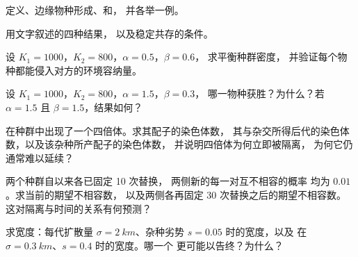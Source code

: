 \begin{exercise}[$\star$]\label{exo:b2:speciation:3}
定义、边缘物种形成、和，
并各举一例。
\end{exercise}

\begin{exercise}[$\star$]\label{exo:b2:speciation:4}
用文字叙述的四种结果，
以及稳定共存的条件。
\end{exercise}

\begin{exercise}[$\star\star$]\label{exo:b2:speciation:5}
设 $K_1 = 1000$，$K_2 = 800$，$\alpha = 0.5$，$\beta = 0.6$，
求平衡种群密度，
并验证每个物种都能侵入对方的环境容纳量。
\end{exercise}

\begin{exercise}[$\star\star$]\label{exo:b2:speciation:6}
设 $K_1 = 1000$，$K_2 = 800$，$\alpha = 1.5$，$\beta = 0.3$，
哪一物种获胜？为什么？若 $\alpha = 1.5$ 且 $\beta = 1.5$，结果如何？
\end{exercise}

\begin{exercise}[$\star\star$]\label{exo:b2:speciation:7}
在种群中出现了一个四倍体。求其配子的染色体数，
其与杂交所得后代的染色体数，以及该杂种所产配子的染色体数，
并说明四倍体为何立即被隔离，
为何它仍通常难以延续？
\end{exercise}

\begin{exercise}[$\star\star$]\label{exo:b2:speciation:8}
两个种群自以来各已固定 10 次替换，
两侧新的每一对互不相容的概率
均为 $0.01$。求当前的期望不相容数，
以及两侧各再固定 30 次替换之后的期望不相容数。
这对隔离与时间的关系有何预测？
\end{exercise}

\begin{exercise}[$\star\star$]\label{exo:b2:speciation:9}
求宽度：每代扩散量 $\sigma =
\qty{2}{km}$、杂种劣势 $s = 0.05$ 时的宽度，以及
在 $\sigma = \qty{0.3}{km}$、$s = 0.4$ 时的宽度。哪一个
更可能以告终？为什么？
\end{exercise}

